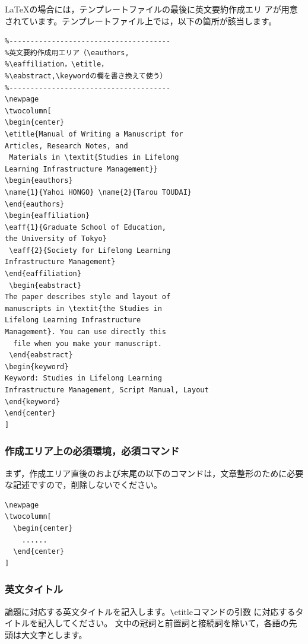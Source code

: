 \documentclass[b5paper,10pt,twocolumn,tombow]{jarticle}
\begin{document}
\LaTeX{}の場合には，テンプレートファイルの最後に英文要約作成エリ
アが用意されています。テンプレートファイル上では，以下の箇所が該当します。

\small{}
\begin{verbatim}
%--------------------------------------
%英文要約作成用エリア（\eauthors,
%\eaffiliation，\etitle，
%\eabstract,\keywordの欄を書き換えて使う）
%--------------------------------------
\newpage
\twocolumn[
\begin{center}
\etitle{Manual of Writing a Manuscript for
Articles, Research Notes, and
 Materials in \textit{Studies in Lifelong
Learning Infrastructure Management}}
\begin{eauthors}
\name{1}{Yahoi HONGO} \name{2}{Tarou TOUDAI}
\end{eauthors}
\begin{eaffiliation}
\eaff{1}{Graduate School of Education,
the University of Tokyo}
 \eaff{2}{Society for Lifelong Learning
Infrastructure Management}
\end{eaffiliation}
 \begin{eabstract}
The paper describes style and layout of
manuscripts in \textit{the Studies in
Lifelong Learning Infrastructure
Management}. You can use directly this
  file when you make your manuscript.
 \end{eabstract}
\begin{keyword}
Keyword: Studies in Lifelong Learning
Infrastructure Management, Script Manual, Layout
\end{keyword}
\end{center}
]
\end{verbatim}
\normalsize

\subsubsection{作成エリア上の必須環境，必須コマンド}
まず，作成エリア直後のおよび末尾の以下のコマンドは，文章整形のために必要
な記述ですので，削除しないでください。
\begin{verbatim}
\newpage
\twocolumn[
  \begin{center}
    ......
  \end{center}
]
\end{verbatim}


\subsubsection{英文タイトル}
論題に対応する英文タイトルを記入します。\verb|\|etitleコマンドの引数
に対応するタイトルを記入してください。
文中の冠詞と前置詞と接続詞を除いて，各語の先頭は大文字とします。
\end{document}
